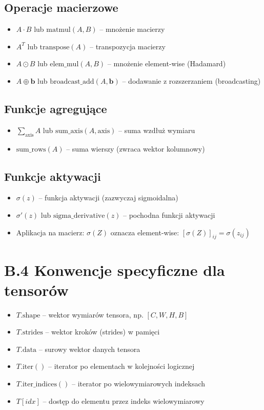 \subsection*{Operacje macierzowe}
\begin{itemize}
	\item $A \cdot B$ lub $\text{matmul}(A, B)$ -- mnożenie macierzy
	\item $A^T$ lub $\text{transpose}(A)$ -- transpozycja macierzy
	\item $A \odot B$ lub $\text{elem\_mul}(A, B)$ -- mnożenie element-wise (Hadamard)
	\item $A \oplus \mathbf{b}$ lub $\text{broadcast\_add}(A, \mathbf{b})$ -- dodawanie z rozszerzaniem (broadcasting)
\end{itemize}

\subsection*{Funkcje agregujące}
\begin{itemize}
	\item $\sum_{\text{axis}} A$ lub $\text{sum\_axis}(A, \text{axis})$ -- suma wzdłuż wymiaru
	\item $\text{sum\_rows}(A)$ -- suma wierszy (zwraca wektor kolumnowy)
\end{itemize}

\subsection*{Funkcje aktywacji}
\begin{itemize}
	\item $\sigma(z)$ -- funkcja aktywacji (zazwyczaj sigmoidalna)
	\item $\sigma'(z)$ lub $\text{sigma\_derivative}(z)$ -- pochodna funkcji aktywacji
	\item Aplikacja na macierz: $\sigma(Z)$ oznacza element-wise: $[\sigma(Z)]_{ij} = \sigma(z_{ij})$
\end{itemize}

\section*{B.4 Konwencje specyficzne dla tensorów}

\begin{itemize}
	\item $T.\text{shape}$ -- wektor wymiarów tensora, np. $[C, W, H, B]$
	\item $T.\text{strides}$ -- wektor kroków (strides) w pamięci
	\item $T.\text{data}$ -- surowy wektor danych tensora
	\item $T.\text{iter}()$ -- iterator po elementach w kolejności logicznej
	\item $T.\text{iter\_indices}()$ -- iterator po wielowymiarowych indeksach
	\item $T[idx]$ -- dostęp do elementu przez indeks wielowymiarowy
\end{itemize}

